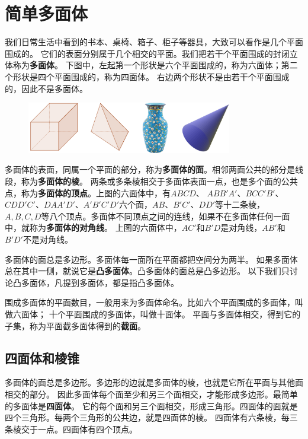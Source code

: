 \documentclass[12pt,UTF8]{ctexbook}
\begin{document}
\chapter{简单多面体}
我们日常生活中看到的书本、桌椅、箱子、柜子等器具，大致可以看作是几个平面围成的。
它们的表面分别属于几个相交的平面。我们把若干个平面围成的封闭立体称为\textbf{多面体}。
下图中，左起第一个形状是六个平面围成的，称为六面体；第二个形状是四个平面围成的，称为四面体。
右边两个形状不是由若干个平面围成的，因此不是多面体。

\begin{figure}[h] 
    \centering
    \includegraphics[width=0.8\textwidth]{tu/多面体1.png}
\end{figure}

多面体的表面，同属一个平面的部分，称为\textbf{多面体的面}。相邻两面公共的部分是线段，称为\textbf{多面体的棱}。
两条或多条棱相交于多面体表面一点，也是多个面的公共点，称为\textbf{多面体的顶点}。上图的六面体中，有$ABCD$、
$ABB'A'$、$BCC'B'$、$CDD'C'$、$DAA'D'$、$A'B'C'D'$六个面，$AB$、$B'C'$、$DD'$等十二条棱，
$A,B,C,D$等八个顶点。多面体不同顶点之间的连线，如果不在多面体任何一面中，就称为\textbf{多面体的对角线}。
上图的六面体中，$AC'$和$B'D$是对角线，$AB'$和$B'D'$不是对角线。

多面体的面总是多边形。多面体每一面所在平面都把空间分为两半。
如果多面体总在其中一侧，就说它是\textbf{凸多面体}。凸多面体的面总是凸多边形。
以下我们只讨论凸多面体，凡提到多面体，都是指凸多面体。

围成多面体的平面数目，一般用来为多面体命名。比如六个平面围成的多面体，叫做六面体；
十个平面围成的多面体，叫做十面体。
平面与多面体相交，得到它的子集，称为平面截多面体得到的\textbf{截面}。

\section{四面体和棱锥}
多面体的面总是多边形。多边形的边就是多面体的棱，也就是它所在平面与其他面相交的部分。
因此多面体每个面至少和另三个面相交，才能形成多边形。最简单的多面体是\textbf{四面体}。
它的每个面和另三个面相交，形成三角形。四面体的面就是四个三角形。每两个三角形的公共边，就是四面体的棱。
四面体有六条棱，每三条棱交于一点。四面体有四个顶点。
\end{document}
